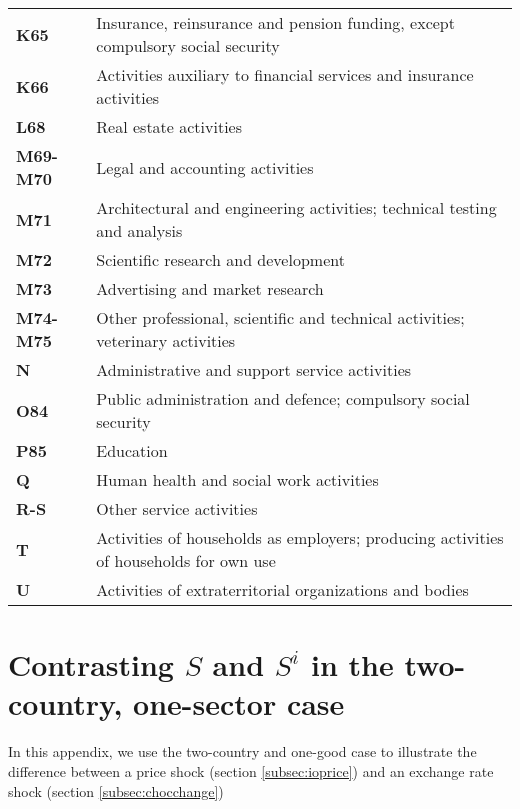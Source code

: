 \documentclass[11pt,a4paper]{article}
\begin{document}
\begin{table}[!h]
\begin{tabular}{ll}
\textbf{K65} &{Insurance, reinsurance and pension funding, except compulsory social security}\\
\textbf{K66} &{Activities auxiliary to financial services and insurance activities}\\
\textbf{L68} &{Real estate activities}\\
\textbf{M69-M70} &{Legal and accounting activities}\\
\textbf{M71} &{Architectural and engineering activities; technical testing and analysis}\\
\textbf{M72} &{Scientific research and development}\\
\textbf{M73} &{Advertising and market research}\\
\textbf{M74-M75} &{Other professional, scientific and technical activities; veterinary activities}\\
\textbf{N} &{Administrative and support service activities}\\
\textbf{O84} &{Public administration and defence; compulsory social security}\\
\textbf{P85} &{Education}\\
\textbf{Q} &{Human health and social work activities}\\
\textbf{R-S} &{Other service activities}\\
\textbf{T} &{Activities of households as employers; producing activities of households for own use}\\
\textbf{U} &{Activities of extraterritorial organizations and bodies}\\
  	\end{tabular}
\label{tab:wiodindustries}
\end{table}

\newpage
\section{Contrasting $S$ and $S^i$ in the two-country, one-sector case}
In this appendix, we use the two-country and one-good case to illustrate the difference between a price shock (section \ref{subsec:ioprice}) and an exchange rate shock (section \ref{subsec:chocchange})
\end{document}
